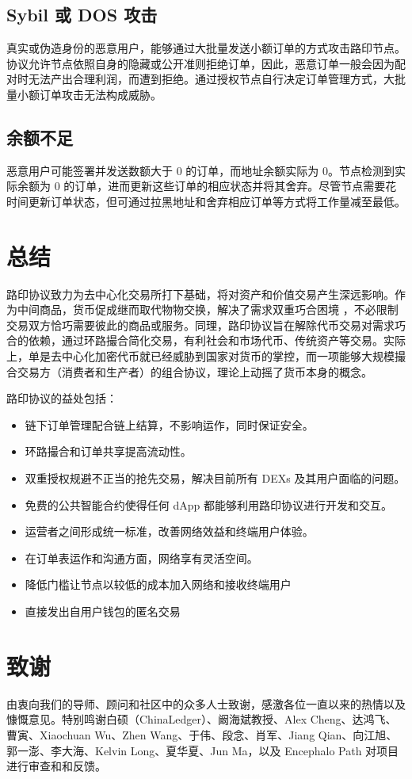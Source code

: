\documentclass[UTF8,nofonts]{ctexart}%
\begin{document}
\begin{multicols}{2}
\subsection{Sybil 或 DOS 攻击}
真实或伪造身份的恶意用户，能够通过大批量发送小额订单的方式攻击路印节点。协议允许节点依照自身的隐藏或公开准则拒绝订单，因此，恶意订单一般会因为配对时无法产出合理利润，而遭到拒绝。通过授权节点自行决定订单管理方式，大批量小额订单攻击无法构成威胁。

\subsection{余额不足}
恶意用户可能签署并发送数额大于 0 的订单，而地址余额实际为 0。节点检测到实际余额为 0 的订单，进而更新这些订单的相应状态并将其舍弃。尽管节点需要花时间更新订单状态，但可通过拉黑地址和舍弃相应订单等方式将工作量减至最低。

\section{总结}

路印协议致力为去中心化交易所打下基础，将对资产和价值交易产生深远影响。作为中间商品，货币促成继而取代物物交换，解决了需求双重巧合困境 \cite{unenumerated2006}，不必限制交易双方恰巧需要彼此的商品或服务。同理，路印协议旨在解除代币交易对需求巧合的依赖，通过环路撮合简化交易，有利社会和市场代币、传统资产等交易。实际上，单是去中心化加密代币就已经威胁到国家对货币的掌控，而一项能够大规模撮合交易方（消费者和生产者）的组合协议，理论上动摇了货币本身的概念。

路印协议的益处包括：

\begin{itemize}
	\item 链下订单管理配合链上结算，不影响运作，同时保证安全。
	\item 环路撮合和订单共享提高流动性。
	\item 双重授权规避不正当的抢先交易，解决目前所有 DEXs 及其用户面临的问题。
	\item 免费的公共智能合约使得任何 dApp 都能够利用路印协议进行开发和交互。
	\item 运营者之间形成统一标准，改善网络效益和终端用户体验。
	\item 在订单表运作和沟通方面，网络享有灵活空间。
	\item 降低门槛让节点以较低的成本加入网络和接收终端用户
	\item 直接发出自用户钱包的匿名交易
\end{itemize}

\section{致谢}
由衷向我们的导师、顾问和社区中的众多人士致谢，感激各位一直以来的热情以及慷慨意见。特别鸣谢白硕（ChinaLedger）、阚海斌教授、Alex Cheng、达鸿飞、曹寅、Xiaochuan Wu、Zhen Wang、于伟、段念、肖军、Jiang Qian、向江旭、郭一澎、李大海、Kelvin Long、夏华夏、Jun Ma，以及 Encephalo Path 对项目进行审查和和反馈。





\end{multicols}
\end{document}
